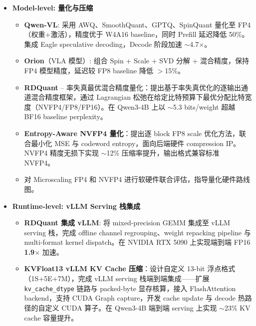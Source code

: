\documentclass{resume_zh}
\begin{document}
\begin{itemize}

\item \textbf{Model-level: 量化与压缩}
\begin{itemize}
  \item \textbf{Qwen-VL}: 采用 AWQ、SmoothQuant、GPTQ、SpinQuant 量化至 FP4（权重+激活），精度优于 W4A16 baseline，同时 Prefill 延迟降低 50\%。集成 Eagle speculative decoding，Decode 阶段加速 $\sim$4.7$\times$。
  \item \textbf{Orion}（VLA 模型）: 组合 Spin + Scale + SVD 分解 + 混合精度，保持 FP4 模型精度，延迟较 FP8 baseline 降低 $>$15\%。
  \item \textbf{RDQuant} -- 率失真最优混合精度量化：提出基于率失真优化的逐输出通道混合精度框架，通过 Lagrangian 松弛在给定比特预算下最优分配比特宽度（NVFP4/FP8/FP16）。在 Qwen3-4B 上以 $\sim$5.3 bits/weight 超越 BF16 baseline perplexity。
  \item \textbf{Entropy-Aware NVFP4 量化}：提出逐 block FP8 scale 优化方法，联合最小化 MSE 与 codeword entropy，面向后端硬件 compression IP。NVFP4 精度无损下实现 $\sim$12\% 压缩率提升，输出格式兼容标准 NVFP4。
  \item 对 Microscaling FP4 和 NVFP4 进行软硬件联合评估，指导量化硬件路线图。
\end{itemize}

\item \textbf{Runtime-level: vLLM Serving 栈集成}
\begin{itemize}
  \item \textbf{RDQuant 集成 vLLM}: 将 mixed-precision GEMM 集成至 vLLM serving 栈，完成 offline channel regrouping、weight repacking pipeline 与 multi-format kernel dispatch。在 NVIDIA RTX 5090 上实现端到端 FP16 \textbf{1.9$\times$} 加速。
  \item \textbf{KVFloat13 vLLM KV Cache 压缩}：设计自定义 13-bit 浮点格式（1S+5E+7M），完成 vLLM serving 栈端到端集成——扩展 \texttt{kv\_cache\_dtype} 链路与 packed-byte 显存核算，接入 FlashAttention backend，支持 CUDA Graph capture，开发 cache update 与 decode 热路径的自定义 CUDA 算子。在 Qwen3-4B 端到端 serving 上实现 $\sim$23\% KV cache 容量提升。
\end{itemize}


\end{itemize}
\end{document}
